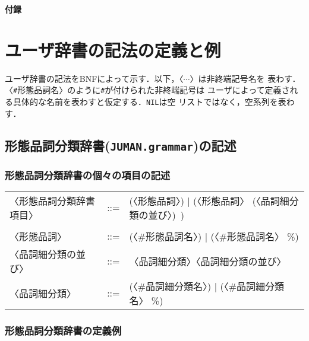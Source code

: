 \documentclass[a4j,titlepage]{jarticle}
\begin{document}
\clearpage


\noindent
{\LARGE\bf 付録}

\appendix

\section{ユーザ辞書の記法の定義と例}\label{app:jisho_rei}

ユーザ辞書の記法をBNFによって示す．以下，〈$\cdots$〉は非終端記号名を
表わす．〈{\tt \#}形態品詞名〉のように{\tt \#}が付けられた非終端記号は
ユーザによって定義される具体的な名前を表わすと仮定する．{\tt NIL}は空
リストではなく，空系列を表わす．

\subsection{形態品詞分類辞書({\tt JUMAN.grammar})の記述}\label{app:grammar}

\subsubsection{形態品詞分類辞書の個々の項目の記述}

\begin{tt}
\begin{tabular}{lll}
〈形態品詞分類辞書項目〉& ::= & (〈形態品詞〉)
                                | (〈形態品詞〉 (〈品詞細分類の並び〉)\ )\\
\\
〈形態品詞〉    & ::= & (〈\#形態品詞名〉) | (〈\#形態品詞名〉 \%)\\
〈品詞細分類の並び〉& ::= & 〈品詞細分類〉〈品詞細分類の並び〉\\
〈品詞細分類〉  & ::= & (〈\#品詞細分類名〉) | (〈\#品詞細分類名〉 \%)\\
\end{tabular}
\end{tt}

\subsubsection{形態品詞分類辞書の定義例}
\end{document}
